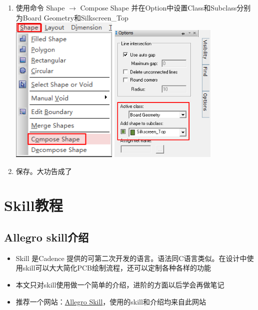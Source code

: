 \documentclass[color=green,mathpazo,titlestyle=hang,11pt]{elegantbook}
\begin{document}
\begin{enumerate}
		\item 使用命令 Shape $\rightarrow$ Compose Shape 并在Option中设置Class和Subclass分别为Board Geometry和Silkscreen\_Top \\ \includegraphics[width=0.4\textwidth]{figures/ShapeComposeShape.png} \includegraphics[width=0.4\textwidth]{figures/OptionClassAndSubClass.png}
		\item 保存。大功告成了
	\end{enumerate}

\section{Skill教程}
	\subsection{Allegro skill介绍}
		\begin{itemize}
			\item Skill 是Cadence 提供的可第二次开发的语言。语法同C语言类似。在设计中使用skill可以大大简化PCB绘制流程，还可以定制各种各样的功能
			\item 本文只对skill使用做一个简单的介绍，进阶的方面以后学会再做笔记
			\item 推荐一个网站：\href{http://www.allegro-skill.com/?fromuid=7754}{Allegro Skill}，使用的skill和介绍均来自此网站
		\end{itemize}
\end{document}
